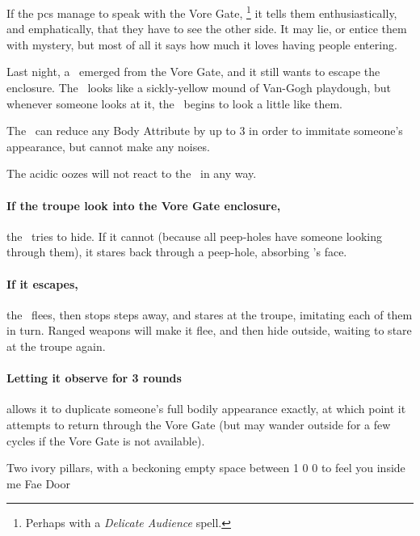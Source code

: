 \begin{multicols}{2}
If the \glspl{pc} manage to speak with the Vore Gate,%
\footnote{Perhaps with a \textit{Delicate Audience} spell.}
it tells them enthusiastically, and emphatically, that they have to see the other side.
It may lie, or entice them with mystery, but most of all it says how much it loves having people entering.

\setcounter{statDots}{0}

\mphlg

Last night, a \superWierdzi\ emerged from the Vore Gate, and it still wants to escape the enclosure.
The \superWierdzi\ looks like a sickly-yellow mound of Van-Gogh playdough, but whenever someone looks at it, the \superWierdzi\ begins to look a little like them.

The \superWierdzi\ can reduce any Body Attribute by up to 3 in order to immitate someone's appearance, but cannot make any noises.

The acidic oozes will not react to the \superWierdzi\ in any way.

\paragraph{If the troupe look into the Vore Gate enclosure,}
the \superWierdzi\ tries to hide.
If it cannot (because all peep-holes have someone looking through them), it stares back through a peep-hole, absorbing 's face.

\paragraph{If it escapes,}
the \superWierdzi\ flees, then stops steps away, and stares at the troupe, imitating each of them in turn.
Ranged weapons will make it flee, and then hide outside, waiting to stare at the troupe again.

\paragraph{Letting it observe for 3 rounds}
allows it to duplicate someone's full bodily appearance exactly, at which point it attempts to return through the Vore Gate (but may wander outside for a few \glspl{cycle} if the Vore Gate is not available).

  {Two ivory pillars, with a beckoning empty space between}%
  {1}%
  {0}%
  {0}%
  {to feel you inside me}%
  {Fae Door}%
  {
    \setcounter{Fire}{3}
    \setcounter{Earth}{2}
    \setcounter{Fate}{1}
    \setcounter{Water}{1}
    \setcounter{Academics}{2}
    \setcounter{Cultivation}{1}
  }%


\end{multicols}

